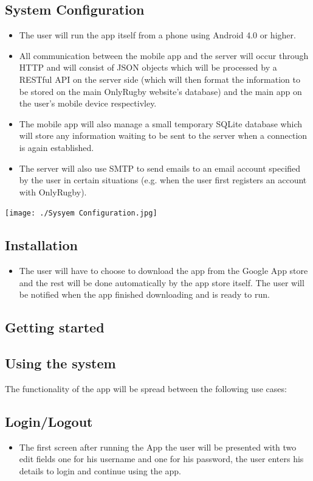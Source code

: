 \documentclass[hidelinks,a4paper,12pt]{article}
\begin{document}
\subsection{System Configuration}
\begin {itemize}
	\item The user will run the app itself from a phone using Android 4.0 or higher.
	\item All communication between the mobile app and the server will occur through HTTP and will consist of JSON objects which will be processed by a RESTful API on the server side (which will then format the information to be stored on the main OnlyRugby website's database) and the main app on the user's mobile device respectivley.
	\item The mobile app will also manage a small temporary SQLite database which will store any information waiting to be sent to the server when a connection is again established.
	\item The server will also use SMTP to send emails to an email account specified by the user in certain situations (e.g. when the user first registers an account with OnlyRugby). 
\end{itemize}
\begin{center}
  	 \texttt{[image: ./Sysyem Configuration.jpg]}\\[0.4cm]
\end{center}
\subsection{Installation}
\begin {itemize}
	\item The user will have to choose to download the app from the Google App store and the rest will be done automatically by the app store itself. The user will be notified when the app finished downloading and is ready to run.
\end{itemize}

\subsection{Getting started}
	
\subsection{Using the system}
The functionality of the app will be spread between the following use cases:
	\subsection{Login/Logout}
		\begin {itemize}
			\item The first screen after running the App the user will be presented with two edit fields one for his username and one for his password, the user enters his details to login and continue using the app.
		\end{itemize}
\end{document}

